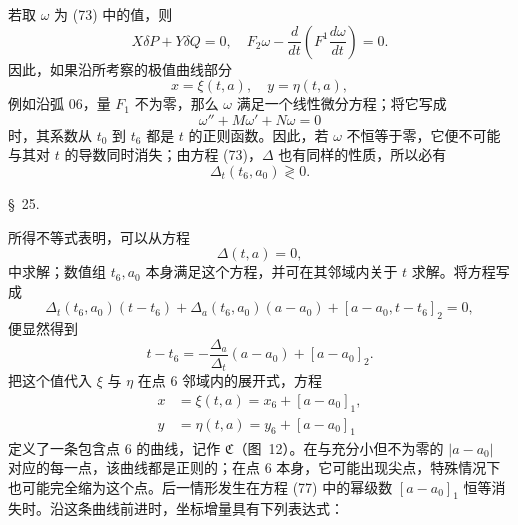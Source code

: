 \documentclass[11pt,a4paper,leqno]{article}
\begin{document}
若取 $\omega$ 为 (73) 中的值，则
\[
X\delta P+Y\delta Q=0,
\quad
F_2\omega-\frac{d}{dt}\left(F^1\frac{d\omega}{dt}\right)=0.
\]
因此，如果沿所考察的极值曲线部分
\[
x=\xi(t,a),\quad y=\eta(t,a),
\]
例如沿弧 06，量 $F_1$ 不为零，那么 $\omega$ 满足一个线性微分方程；将它写成
\[
\omega''+M\omega'+N\omega=0
\]
时，其系数从 $t_0$ 到 $t_6$ 都是 $t$ 的正则函数。因此，若 $\omega$ 不恒等于零，它便不可能与其对 $t$ 的导数同时消失；由方程 (73)，$\Delta$ 也有同样的性质，所以必有
\[
\Delta_t(t_6,a_0)\gtrless0.
\]

\begin{center}{\large \S~25.}\end{center}

所得不等式表明，可以从方程
\begin{equation}\tag{76}
\Delta(t,a)=0,
\end{equation}
中求解；数值组 $t_6,a_0$ 本身满足这个方程，并可在其邻域内关于 $t$ 求解。将方程写成
\[
\Delta_t(t_6,a_0)(t-t_6)+\Delta_a(t_6,a_0)(a-a_0)+[a-a_0,t-t_6]_2=0,
\]
便显然得到
\[
t-t_6=-\frac{\Delta_a}{\Delta_t}(a-a_0)+[a-a_0]_2.
\]
把这个值代入 $\xi$ 与 $\eta$ 在点 6 邻域内的展开式，方程
\begin{equation}\tag{77}
\begin{aligned}
x&=\xi(t,a)=x_6+[a-a_0]_1,\\
y&=\eta(t,a)=y_6+[a-a_0]_1
\end{aligned}
\end{equation}
定义了一条包含点 6 的曲线，记作 $\mathfrak{C}$（图~12）。在与充分小但不为零的 $|a-a_0|$ 对应的每一点，该曲线都是正则的；在点 6 本身，它可能出现尖点，特殊情况下也可能完全缩为这个点。后一情形发生在方程 (77) 中的幂级数 $[a-a_0]_1$ 恒等消失时。沿这条曲线前进时，坐标增量具有下列表达式：
\end{document}
